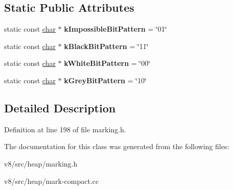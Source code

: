 \subsection*{Static Public Attributes}
\begin{DoxyCompactItemize}
\item 
\mbox{\label{classv8_1_1internal_1_1Marking_a5d5b84d1f33bf8544a82e61861214335}} 
static const \mbox{\hyperlink{classchar}{char}} $\ast$ {\bfseries k\+Impossible\+Bit\+Pattern} = \char`\"{}01\char`\"{}
\item 
\mbox{\label{classv8_1_1internal_1_1Marking_ae266eec4e20a094664f5e87e47ed9bb6}} 
static const \mbox{\hyperlink{classchar}{char}} $\ast$ {\bfseries k\+Black\+Bit\+Pattern} = \char`\"{}11\char`\"{}
\item 
\mbox{\label{classv8_1_1internal_1_1Marking_ae1a2d716903841ec64024f8ccaba6d7a}} 
static const \mbox{\hyperlink{classchar}{char}} $\ast$ {\bfseries k\+White\+Bit\+Pattern} = \char`\"{}00\char`\"{}
\item 
\mbox{\label{classv8_1_1internal_1_1Marking_a9b85ac4c30060dde97a977e7b6346d55}} 
static const \mbox{\hyperlink{classchar}{char}} $\ast$ {\bfseries k\+Grey\+Bit\+Pattern} = \char`\"{}10\char`\"{}
\end{DoxyCompactItemize}


\subsection{Detailed Description}


Definition at line 198 of file marking.\+h.



The documentation for this class was generated from the following files\+:\begin{DoxyCompactItemize}
\item 
v8/src/heap/marking.\+h\item 
v8/src/heap/mark-\/compact.\+cc\end{DoxyCompactItemize}
